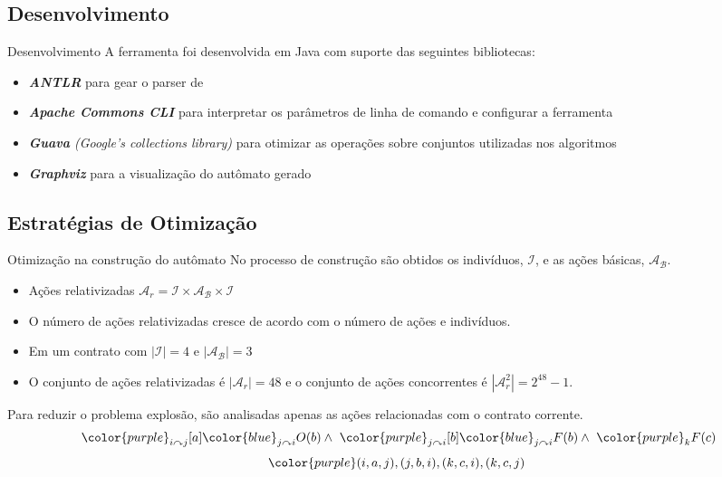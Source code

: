 \subsection{Desenvolvimento}

\begin{frame}{Desenvolvimento}
    A ferramenta foi desenvolvida em Java com suporte das seguintes bibliotecas:
    \begin{itemize}
        \item \textit{\textbf{ANTLR}} para gear o parser de \RCL
        \item \textit{\textbf{Apache Commons CLI}} para interpretar os parâmetros de linha de comando e configurar a ferramenta
        \item \textit{\textbf{Guava} (Google's collections library)} para otimizar as operações sobre conjuntos utilizadas nos algoritmos
        \item \textit{\textbf{Graphviz}} para a visualização do autômato gerado
    \end{itemize}
\end{frame}

\subsection{Estratégias de Otimização}

\begin{frame}{Otimização na construção do autômato}
    No processo de construção são obtidos os indivíduos, $\mathcal{I}$, e as ações básicas, $\mathcal{A_B}$. 
    \begin{itemize}
        \item Ações relativizadas $\mathcal{A}_r = \mathcal{I}\times\mathcal{A_B}\times\mathcal{I}$
        \item O número de ações relativizadas cresce de acordo com o número de ações e indivíduos. 
        \item Em um contrato com $|\mathcal{I}|=4$ e $|\mathcal{A_B}|=3$
        \item O conjunto de ações relativizadas é $|\mathcal{A}_r|=48$ e o conjunto de ações concorrentes é $|\mathcal{A}_r^2|=2^{48}-1$. 
    \end{itemize}
    
    Para reduzir o problema explosão, são analisadas apenas as ações relacionadas com o contrato corrente.
    $$\ {\color{purple} _{i\curvearrowright j}[a]} {\color{blue} _{j\curvearrowright i}O(b)} \wedge \ {\color{purple} _{j\curvearrowright i}[b]} {\color{blue}  _{j\curvearrowright i}F(b)} \wedge \ {\color{purple} _{k}F(c)}$$
    $${\color{purple} (i,a,j), (j,b,i), (k,c,i), (k,c,j)}$$
\end{frame}



